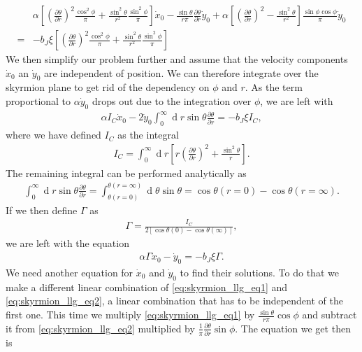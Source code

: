 \documentclass[12pt, a4paper, twoside, openright]{article}		%
\renewcommand{\d}[1]{\ensuremath{\operatorname{d}\!{#1}}}
\numberwithin{equation}{section}
\begin{document}
\begin{align}
\nonumber &\alpha\left[ (\frac{\partial\theta}{\partial r})^2\frac{\cos^2\phi}{\pi} + \frac{\sin^2\theta}{r^2}\frac{\sin^2\phi}{\pi}\right] \dot{x}_0 - \frac{\sin\theta}{r \pi}\frac{\partial\theta}{\partial r}\dot{y}_0 
+ \alpha \left[(\frac{\partial\theta}{\partial r})^2-\frac{\sin^2\theta}{r^2}\right]\frac{\sin\phi\cos\phi}{\pi}\dot{y}_0 \\
= &-b_J\xi\left[ (\frac{\partial\theta}{\partial r})^2\frac{\cos^2\phi}{\pi} + \frac{\sin^2\theta}{r^2}\frac{\sin^2\phi}{\pi}\right]
\end{align}
We then simplify our problem further and assume that the velocity components $\dot{x}_0$ an $\dot{y}_0$ are independent of position. We can therefore integrate over the skyrmion plane to get rid of the dependency on $\phi$ and $r$. As the term proportional to $\alpha\dot{y}_0$ drops out due to the integration over $\phi$, we are left with
\begin{align}
\alpha I_C \dot{x}_0 - 2\dot{y}_0\int_0^{\infty}\d r \sin\theta\frac{\partial\theta}{\partial r} = -b_J\xi I_C,
\end{align}
where we have defined $I_C$ as the integral
\begin{align}
I_C = \int_0^{\infty} \d r \left[ r(\frac{\partial\theta}{\partial r})^2 + \frac{\sin^2\theta}{r}\right] .
\end{align}
The remaining integral can be performed analytically as
\begin{align}
\int_0^{\infty}\d r \sin\theta \frac{\partial\theta}{\partial r} = \int_{\theta(r =0)}^{\theta(r = \infty)}\d \theta \sin\theta = \cos\theta(r = 0) - \cos\theta (r = \infty).
\end{align}
If we then define $\Gamma$ as
\begin{align}
\label{eq:Gamma}
\Gamma = \frac{I_C}{2[\cos\theta(0)-\cos\theta(\infty)]},
\end{align}
we are left with the equation
\begin{align}
\label{eq:skyrmion_xy_eq1}
\alpha\Gamma \dot{x}_0 - \dot{y}_0 = -b_J\xi\Gamma.
\end{align}
We need another equation for $\dot{x}_0$ and $\dot{y}_0$ to find their solutions. To do that we make a different linear combination of \eqref{eq:skyrmion_llg_eq1} and \eqref{eq:skyrmion_llg_eq2}, a linear combination that has to be independent of the first one. This time we multiply \eqref{eq:skyrmion_llg_eq1} by $\frac{\sin\theta}{r \pi}\cos\phi$ and subtract it from \eqref{eq:skyrmion_llg_eq2} multiplied by $\frac{1}{\pi}\frac{\partial\theta}{\partial r}\sin\phi$. The equation we get then is
\end{document}
